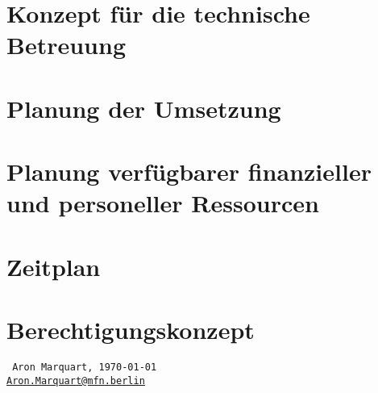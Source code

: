 \documentclass[11pt]{article}
\begin{document}
\section{Konzept für die technische Betreuung}

\section{Planung der Umsetzung}

\section{Planung verfügbarer finanzieller und personeller Ressourcen}

\section{Zeitplan}

\section{Berechtigungskonzept}

\bigskip
\vfill

{
    \raggedleft
    \tt
    {Aron Marquart, \today}\\
    \href{mailto:Aron.Marquart@mfn.berlin}{Aron.Marquart@mfn.berlin}\\
}
\end{document}
